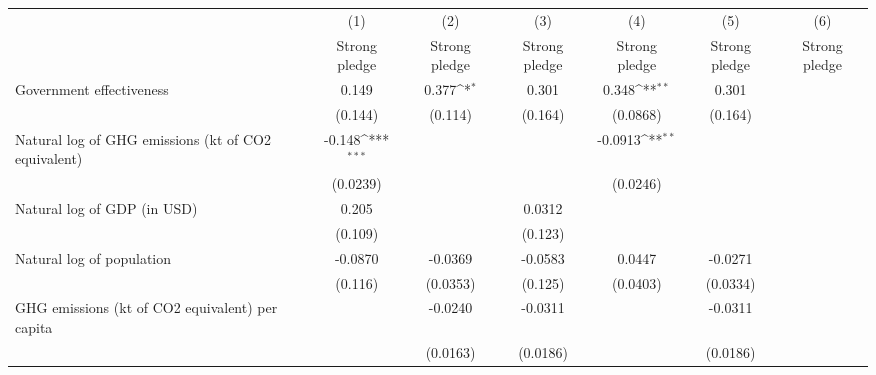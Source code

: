 {
\def\sym#1{\ifmmode^{#1}\else\(^{#1}\)\fi}
\begin{tabular}{l*{6}{c}}
\hline\hline
                    &\multicolumn{1}{c}{(1)}&\multicolumn{1}{c}{(2)}&\multicolumn{1}{c}{(3)}&\multicolumn{1}{c}{(4)}&\multicolumn{1}{c}{(5)}&\multicolumn{1}{c}{(6)}\\
                    &\multicolumn{1}{c}{Strong pledge}&\multicolumn{1}{c}{Strong pledge}&\multicolumn{1}{c}{Strong pledge}&\multicolumn{1}{c}{Strong pledge}&\multicolumn{1}{c}{Strong pledge}&\multicolumn{1}{c}{Strong pledge}\\
\hline
Government effectiveness&       0.149         &       0.377\sym{*}  &       0.301         &       0.348\sym{**} &       0.301         &                     \\
                    &     (0.144)         &     (0.114)         &     (0.164)         &    (0.0868)         &     (0.164)         &                     \\
[1em]
Natural log of GHG emissions (kt of CO2 equivalent)&      -0.148\sym{***}&                     &                     &     -0.0913\sym{**} &                     &                     \\
                    &    (0.0239)         &                     &                     &    (0.0246)         &                     &                     \\
[1em]
Natural log of GDP (in USD)&       0.205         &                     &      0.0312         &                     &                     &                     \\
                    &     (0.109)         &                     &     (0.123)         &                     &                     &                     \\
[1em]
Natural log of population&     -0.0870         &     -0.0369         &     -0.0583         &      0.0447         &     -0.0271         &                     \\
                    &     (0.116)         &    (0.0353)         &     (0.125)         &    (0.0403)         &    (0.0334)         &                     \\
[1em]
GHG emissions (kt of CO2 equivalent) per capita&                     &     -0.0240         &     -0.0311         &                     &     -0.0311         &                     \\
                    &                     &    (0.0163)         &    (0.0186)         &                     &    (0.0186)         &                     \\

\end{tabular}}
